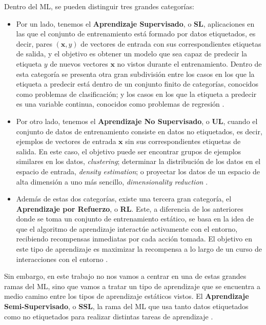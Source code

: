 Dentro del \gls{ML}, se pueden distinguir tres grandes categorías:
\begin{itemize}
    \item Por un lado, tenemos el \textbf{Aprendizaje Supervisado}, o \textbf{\gls{SL}}, aplicaciones en las que el conjunto de entrenamiento está formado por datos etiquetados, es decir, pares $(\mathbf{x}, y)$ de vectores de entrada con sus correspondientes etiquetas de salida, y el objetivo es obtener un modelo que sea capaz de predecir la etiqueta $y$ de nuevos vectores $\mathbf{x}$ no vistos durante el entrenamiento. Dentro de esta categoría se presenta otra gran subdivisión entre los casos en los que la etiqueta a predecir está dentro de un conjunto finito de categorías, conocidos como problemas de clasificación; y los casos en los que la etiqueta a predecir es una variable continua, conocidos como problemas de regresión \cite{bishop2006pattern}. 
    \item Por otro lado, tenemos el \textbf{Aprendizaje No Supervisado}, o \textbf{\gls{UL}}, cuando el conjunto de datos de entrenamiento consiste en datos no etiquetados, es decir, ejemplos de vectores de entrada $\mathbf{x}$ sin sus correspondientes etiquetas de salida. En este caso, el objetivo puede ser encontrar grupos de ejemplos similares en los datos, \textit{clustering}; determinar la distribución de los datos en el espacio de entrada, \textit{density estimation}; o proyectar los datos de un espacio de alta dimensión a uno más sencillo, \textit{dimensionality reduction} \cite{bishop2006pattern}.
    \item Además de estas dos categorías, existe una tercera gran categoría, el \textbf{Aprendizaje por Refuerzo}, o \textbf{\gls{RL}}. Este, a diferencia de los anteriores donde se toma un conjunto de entrenamiento estático, se basa en la idea de que el algoritmo de aprendizaje interactúe activamente con el entorno, recibiendo recompensas inmediatas por cada acción tomada. El objetivo en este tipo de aprendizaje es maximizar la recompensa a lo largo de un curso de interacciones con el entorno \cite{mohri2018foundations}.

\end{itemize}

Sin embargo, en este trabajo no nos vamos a centrar en una de estas grandes ramas del \gls{ML}, sino que vamos a tratar un tipo de aprendizaje que se encuentra a medio camino entre los tipos de aprendizaje estáticos vistos. El \textbf{Aprendizaje Semi-Supervisado}, o \textbf{\gls{SSL}}, la rama del \gls{ML} que usa tanto datos etiquetados como no etiquetados para realizar distintas tareas de aprendizaje \cite{van2020survey}. 

